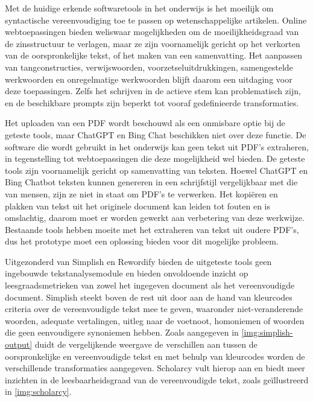 \medspace

Met de huidige erkende softwaretools in het onderwijs is het moeilijk om syntactische vereenvoudiging toe te passen op wetenschappelijke artikelen. Online webtoepassingen bieden weliswaar mogelijkheden om de moeilijkheidsgraad van de zinsstructuur te verlagen, maar ze zijn voornamelijk gericht op het verkorten van de oorspronkelijke tekst, of het maken van een samenvatting. Het aanpassen van tangconstructies, verwijswoorden, voorzetseluitdrukkingen, samengestelde werkwoorden en onregelmatige werkwoorden blijft daarom een uitdaging voor deze toepassingen. Zelfs het schrijven in de actieve stem kan problematisch zijn, en de beschikbare prompts zijn beperkt tot vooraf gedefinieerde transformaties.

\medspace

Het uploaden van een PDF wordt beschouwd als een onmisbare optie bij de geteste tools, maar ChatGPT en Bing Chat beschikken niet over deze functie. De software die wordt gebruikt in het onderwijs kan geen tekst uit PDF's extraheren, in tegenstelling tot webtoepassingen die deze mogelijkheid wel bieden. De geteste tools zijn voornamelijk gericht op samenvatting van teksten. Hoewel ChatGPT en Bing Chatbot teksten kunnen genereren in een schrijfstijl vergelijkbaar met die van mensen, zijn ze niet in staat om PDF's te verwerken. Het kopiëren en plakken van tekst uit het originele document kan leiden tot fouten en is omslachtig, daarom moet er worden gewerkt aan verbetering van deze werkwijze. Bestaande tools hebben moeite met het extraheren van tekst uit oudere PDF's, dus het prototype moet een oplossing bieden voor dit mogelijke probleem.

\medspace

Uitgezonderd van Simplish en Rewordify bieden de uitgeteste tools geen ingebouwde tekstanalysemodule en bieden onvoldoende inzicht op leesgraadsmetrieken van zowel het ingegeven document als het vereenvoudigde document. Simplish steekt boven de rest uit door aan de hand van kleurcodes criteria over de vereenvoudigde tekst mee te geven, waaronder niet-veranderende woorden, adequate vertalingen, uitleg naar de voetnoot, homoniemen of woorden die geen eenvoudigere synoniemen hebben. Zoals aangegeven in \ref{img:simplish-output} duidt de vergelijkende weergave de verschillen aan tussen de oorspronkelijke en vereenvoudigde tekst en met behulp van kleurcodes worden de verschillende transformaties aangegeven. Scholarcy vult hierop aan en biedt meer inzichten in de leesbaarheidsgraad van de vereenvoudigde tekst, zoals geïllustreerd in \ref{img:scholarcy}.

